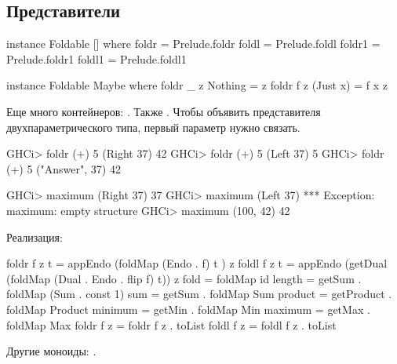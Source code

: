 \documentclass[11pt,a4paper]{article}
\begin{document}
\subsection{Представители}
\begin{hscode}
instance Foldable [] where
  foldr = Prelude.foldr
  foldl = Prelude.foldl
  foldr1 = Prelude.foldr1
  foldl1 = Prelude.foldl1

instance Foldable Maybe where
  foldr _ z Nothing = z
  foldr f z (Just x) = f x z
\end{hscode}
Еще много контейнеров: . Также . Чтобы объявить представителя двухпараметрического типа, первый параметр нужно связать.
\begin{hscode}
GHCi> foldr (+) 5 (Right 37)
42
GHCi> foldr (+) 5 (Left 37)
5
GHCi> foldr (+) 5 ("Answer", 37)
42

GHCi> maximum (Right 37)
37
GHCi> maximum (Left 37)
*** Exception: maximum: empty structure
GHCi> maximum (100, 42)
42
\end{hscode}
Реализация:
\begin{hscode}
foldr f z t = appEndo (foldMap (Endo . f) t ) z
foldl f z t = appEndo (getDual (foldMap (Dual . Endo . flip f) t)) z
fold        = foldMap id
length      = getSum . foldMap (Sum . const 1)
sum         = getSum . foldMap Sum
product     = getProduct . foldMap Product
minimum     = getMin . foldMap Min
maximum     = getMax . foldMap Max
foldr f z   = foldr f z . toList
foldl f z   = foldl f z . toList 
\end{hscode}

Другие моноиды: .
\end{document}
